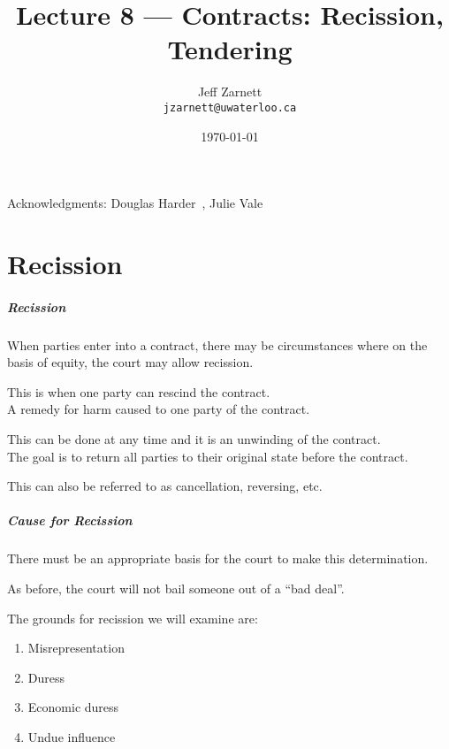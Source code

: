 

\title{Lecture 8 --- Contracts: Recission, Tendering}

\author{Jeff Zarnett \\ \small \texttt{jzarnett@uwaterloo.ca}}
\date{\today}



\begin{frame}
  \titlepage

\begin{center}
  \small{Acknowledgments: Douglas Harder~\cite{dwh}, Julie Vale~\cite{jv}}
  \end{center}
\end{frame}

\part{Recission}

\begin{frame}
\partpage
\end{frame}



\begin{frame}
\frametitle{Recission}

When parties enter into a contract, there may be circumstances where on the basis of equity, the court may allow \alert{recission}.

This is when one party can rescind the contract.\\
\quad A remedy for harm caused to one party of the contract.

This can be done at any time and it is an \alert{unwinding} of the contract.\\
\quad The goal is to return all parties to their original state before the contract.

This can also be referred to as cancellation, reversing, etc.

\end{frame}



\begin{frame}
\frametitle{Cause for Recission}

There must be an appropriate basis for the court to make this determination.

As before, the court will not bail someone out of a ``bad deal''.

The grounds for recission we will examine are:

\begin{enumerate}
	\item Misrepresentation
	\item Duress
	\item Economic duress
	\item Undue influence
\end{enumerate}

\end{frame}



